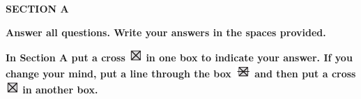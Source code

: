 \documentclass{article}
\date{}
\begin{document}
\fontsize{12}{14} \selectfont %
\setcounter{page}{2}

\begin{center}
    \textbf{SECTION A} \\

    \vspace{10pt}

    \textbf{Answer all questions. Write your answers in the spaces provided. } \\

    \vspace{10pt}

   \textbf{ In Section A put a cross \includegraphics[width=0.5cm]{Exams/Crossed.png} in one box to indicate your answer. If you change your mind, put a line through the box \includegraphics[width=0.6cm]{Exams/Cross_cut.png} and then put a cross \includegraphics[width=0.5cm]{Exams/Crossed.png} in another box. }
    
  
\end{center}

\vspace{30pt}
\end{document}
